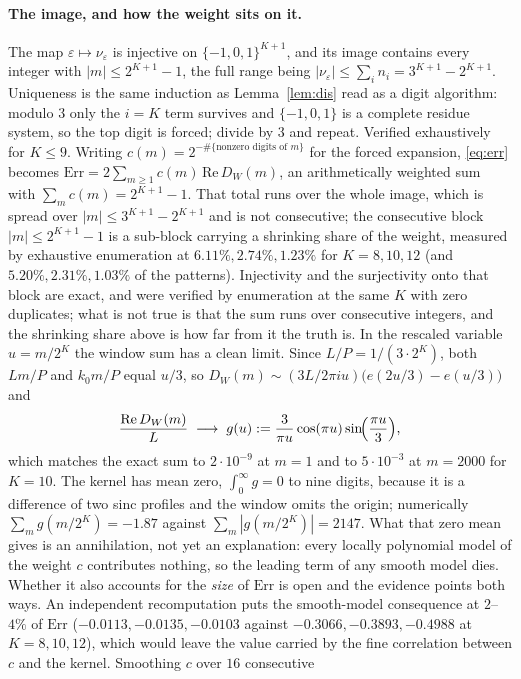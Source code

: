 \documentclass[11pt]{article}
\theoremstyle{remark}
\newcommand{\eps}{\varepsilon}
\begin{document}
\paragraph{The image, and how the weight sits on it.} The map $\eps\mapsto\nu_\eps$ is injective on
$\{-1,0,1\}^{K+1}$, and its image contains every integer with $|m|\le2^{K+1}-1$, the full range being
$|\nu_\eps|\le\sum_i n_i=3^{K+1}-2^{K+1}$. Uniqueness is the same induction as
Lemma~\ref{lem:dis} read as a digit algorithm: modulo $3$ only the $i=K$ term survives and $\{-1,0,1\}$ is
a complete residue system, so the top digit is forced; divide by $3$ and repeat. Verified exhaustively for
$K\le9$. Writing $c(m)=2^{-\#\{\text{nonzero digits of }m\}}$ for the forced expansion, \eqref{eq:err}
becomes $\mathrm{Err}=2\sum_{m\ge1}c(m)\,\mathrm{Re}\,D_W(m)$, an arithmetically weighted sum with
$\sum_mc(m)=2^{K+1}-1$. That total runs over the whole image, which is spread over
$|m|\le3^{K+1}-2^{K+1}$ and is not consecutive; the consecutive block $|m|\le2^{K+1}-1$ is a sub-block
carrying a shrinking share of the weight, measured by exhaustive enumeration at
$6.11\%,2.74\%,1.23\%$ for $K=8,10,12$ (and $5.20\%,2.31\%,1.03\%$ of the patterns). Injectivity and
the surjectivity onto that block are exact, and were verified by enumeration at the same $K$ with zero
duplicates; what is not true is that the sum runs over consecutive integers, and the shrinking share
above is how far from it the truth is. In the rescaled variable $u=m/2^K$ the window sum has a clean
limit. Since $L/P=1/(3\cdot2^K)$, both
$Lm/P$ and $k_0m/P$ equal $u/3$, so $D_W(m)\sim(3L/2\pi iu)\bigl(e(2u/3)-e(u/3)\bigr)$ and
\[
  \frac{\mathrm{Re}\,D_W(m)}{L}\;\longrightarrow\;g(u):=\frac{3}{\pi u}\cos(\pi u)\sin\!\Bigl(\frac{\pi u}{3}\Bigr),
\]
which matches the exact sum to $2\cdot10^{-9}$ at $m=1$ and to $5\cdot10^{-3}$ at $m=2000$ for $K=10$.
The kernel has mean zero, $\int_0^\infty g=0$ to nine digits, because it is a difference of two sinc
profiles and the window omits the origin; numerically $\sum_mg(m/2^K)=-1.87$ against
$\sum_m|g(m/2^K)|=2147$. What that zero mean gives is an annihilation, not yet an explanation: every
locally polynomial model of the weight $c$ contributes nothing, so the leading term of any smooth model
dies. Whether it also accounts for the \emph{size} of $\mathrm{Err}$ is open and the evidence points both
ways. An independent recomputation puts the smooth-model consequence at $2$--$4\%$ of $\mathrm{Err}$
($-0.0113,-0.0135,-0.0103$ against $-0.3066,-0.3893,-0.4988$ at $K=8,10,12$), which would leave the value
carried by the fine correlation between $c$ and the kernel. Smoothing $c$ over $16$ consecutive
\end{document}
